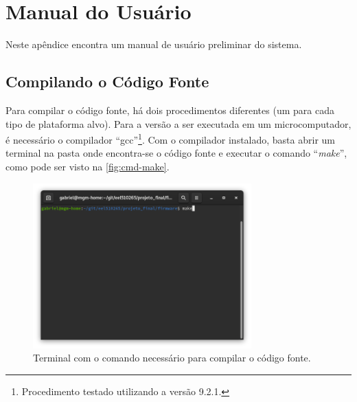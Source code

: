 %
%
%
%
%

%
%
%
%
%

\newpage

\section*{Manual do Usuário} \label{sec:user_manual}

Neste apêndice encontra um manual de usuário preliminar do sistema.

\subsection{Compilando o Código Fonte}

Para compilar o código fonte, há dois procedimentos diferentes (um para cada tipo de plataforma alvo). Para a versão a ser executada em um microcomputador, é necessário o compilador ``gcc''\footnote{Procedimento testado utilizando a versão 9.2.1.}. Com o compilador instalado, basta abrir um terminal na pasta onde encontra-se o código fonte e executar o comando ``\textit{make}'', como pode ser visto na \autoref{fig:cmd-make}.

\begin{figure}[!ht]
    \begin{center}
        \includegraphics[width=0.75\textwidth]{figures/window_make.png}
        \caption{Terminal com o comando necessário para compilar o código fonte.}
        \label{fig:cmd-make}
    \end{center}
\end{figure}

